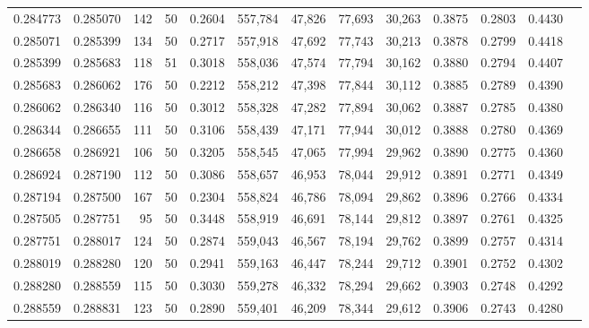 \begin{tabular}{rrrrrrrrrrrrr}
0.284773 & 0.285070 &   142 &  50 &                                     0.2604 & 557,784 &  47,826 &  77,693 &  30,263 & 0.3875 & 0.2803 & 0.4430 \\
0.285071 & 0.285399 &   134 &  50 &                                     0.2717 & 557,918 &  47,692 &  77,743 &  30,213 & 0.3878 & 0.2799 & 0.4418 \\
0.285399 & 0.285683 &   118 &  51 &                                     0.3018 & 558,036 &  47,574 &  77,794 &  30,162 & 0.3880 & 0.2794 & 0.4407 \\
0.285683 & 0.286062 &   176 &  50 &                                     0.2212 & 558,212 &  47,398 &  77,844 &  30,112 & 0.3885 & 0.2789 & 0.4390 \\
0.286062 & 0.286340 &   116 &  50 &                                     0.3012 & 558,328 &  47,282 &  77,894 &  30,062 & 0.3887 & 0.2785 & 0.4380 \\
0.286344 & 0.286655 &   111 &  50 &                                     0.3106 & 558,439 &  47,171 &  77,944 &  30,012 & 0.3888 & 0.2780 & 0.4369 \\
0.286658 & 0.286921 &   106 &  50 &                                     0.3205 & 558,545 &  47,065 &  77,994 &  29,962 & 0.3890 & 0.2775 & 0.4360 \\
0.286924 & 0.287190 &   112 &  50 &                                     0.3086 & 558,657 &  46,953 &  78,044 &  29,912 & 0.3891 & 0.2771 & 0.4349 \\
0.287194 & 0.287500 &   167 &  50 &                                     0.2304 & 558,824 &  46,786 &  78,094 &  29,862 & 0.3896 & 0.2766 & 0.4334 \\
0.287505 & 0.287751 &    95 &  50 &                                     0.3448 & 558,919 &  46,691 &  78,144 &  29,812 & 0.3897 & 0.2761 & 0.4325 \\
0.287751 & 0.288017 &   124 &  50 &                                     0.2874 & 559,043 &  46,567 &  78,194 &  29,762 & 0.3899 & 0.2757 & 0.4314 \\
0.288019 & 0.288280 &   120 &  50 &                                     0.2941 & 559,163 &  46,447 &  78,244 &  29,712 & 0.3901 & 0.2752 & 0.4302 \\
0.288280 & 0.288559 &   115 &  50 &                                     0.3030 & 559,278 &  46,332 &  78,294 &  29,662 & 0.3903 & 0.2748 & 0.4292 \\
0.288559 & 0.288831 &   123 &  50 &                                     0.2890 & 559,401 &  46,209 &  78,344 &  29,612 & 0.3906 & 0.2743 & 0.4280 \\

\end{tabular}

